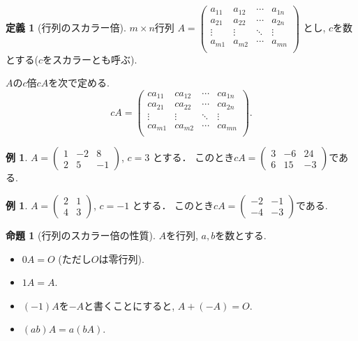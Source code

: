 \documentclass[dvipdfmx,a4paper,11pt]{article}
\theoremstyle{definition}
\newtheorem{prop}[thm]{命題}
\newtheorem{dfn}[thm]{定義}
\newtheorem{exa}[thm]{例}
\begin{document}
  \begin{tcolorbox}[
    colback = white,
    colframe = green!35!black,
    fonttitle = \bfseries,
    breakable = true]
    \begin{dfn}[行列のスカラー倍]
    \text{}
    
 $m \times n$行列
 $
A=\begin{pmatrix}
a_{11}& a_{12} & \cdots &a_{1n} \\
a_{21}& a_{22} & \cdots &a_{2n} \\
\vdots& \vdots	&	\ddots   &	\vdots \\
a_{m1}& a_{m2} & \cdots &a_{mn} \\
\end{pmatrix}$
とし, $c$を数とする($c$をスカラーとも呼ぶ).

$A$の$c$倍$cA$を次で定める.
$$
cA=
\begin{pmatrix}
ca_{11}&c a_{12} & \cdots &ca_{1n} \\
ca_{21}& ca_{22} & \cdots &ca_{2n} \\
\vdots& \vdots	&	\ddots   &	\vdots \\
ca_{m1}& ca_{m2} & \cdots &ca_{mn} \\
\end{pmatrix}.
$$
  \end{dfn}
 \end{tcolorbox}

\begin{exa}
 $A = 
 \begin{pmatrix}
 1 &-2&8 \\
 2&5&-1
 \end{pmatrix}
 $,
 $
 c =3
 $
 とする．
 このとき$
 cA =
 \begin{pmatrix}
 3 &-6&24 \\
 6&15&-3
 \end{pmatrix}
 $である.
 \end{exa}
 \begin{exa}
 $A = 
 \begin{pmatrix}
 2&1 \\
 4&3
 \end{pmatrix}
 $, 
 $
 c =-1
 $
 とする．
 このとき$
 cA =
 \begin{pmatrix}
 -2 &-1 \\
-4&-3
 \end{pmatrix}
 $である.
 \end{exa}
 
 
 \begin{tcolorbox}[
    colback = white,
    colframe = green!35!black,
    fonttitle = \bfseries,
    breakable = true]
    \begin{prop}[行列のスカラー倍の性質]
$A$を行列, $a,b$を数とする.
 \begin{itemize}
 \item $0A =O$ (ただし$O$は零行列).
  \item $1A=A$. 
  \item $(-1)A$を$-A$と書くことにすると, $A + (-A) =O$.　
  \item $(ab) A = a(bA)$.
 \end{itemize}
  \end{prop}
 \end{tcolorbox}
 
\end{document}
